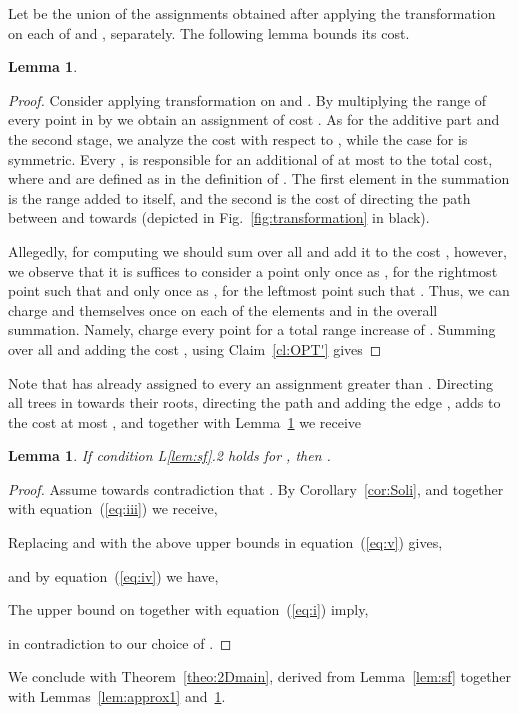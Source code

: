 \documentclass[a4paper]{article}
\newtheorem{lemma}[theorem]{Lemma}
\begin{document}
\begin{algorithm}[htp]
\begin{algorithmic}
Let  be the union of the assignments obtained
after applying the transformation  on each of  and , separately.
The following lemma bounds its cost.
\begin{lemma}\label{lem:g(rho)}

\end{lemma}
\begin{proof}
Consider applying transformation  on  and .
By multiplying the range of every point in  by 
we obtain an assignment of cost .
As for the additive part and the second stage, we analyze the cost with respect to , while the case for  is symmetric.
Every , is responsible for an additional of at most 
to the total cost,
where  and  are defined as in the definition of .
The first element in the summation is the range added to  itself,
and the second is the cost of directing the path between 
and  towards  (depicted in Fig.~\ref{fig:transformation} in black).

Allegedly, for computing  we should sum  over all  and add it to the cost ,
however, we observe that it is suffices to consider a point  only once
as , for the rightmost point  such that  and only once
as , for the leftmost point  such that .
Thus, we can charge  and  themselves once on 
each of the elements  and  in the overall summation.
Namely, charge every point  for a total range increase of .
Summing  over all  and adding the cost , using Claim~\ref{cl:OPT'} gives 

\end{proof}

Note that  has already assigned to every  an assignment greater than .
Directing all trees in  towards their roots,
directing the path  and adding the edge , adds to the cost
at most , and
together with Lemma~\ref{lem:g(rho)} we receive

\begin{lemma}\label{lem:approx2}
If condition L\ref{lem:sf}.2 holds for ,
then .
\end{lemma}
\begin{proof}
Assume towards contradiction that . 
By Corollary~\ref{cor:Soli},  and together with equation~(\ref{eq:iii}) we receive,

Replacing  and  with the above upper bounds in equation~(\ref{eq:v}) gives,

and by equation~(\ref{eq:iv}) we have,

The upper bound on  together with equation~(\ref{eq:i}) imply,

in contradiction to our choice of .
\end{proof}
We conclude with Theorem~\ref{theo:2Dmain}, derived from
Lemma~\ref{lem:sf} together with Lemmas~\ref{lem:approx1} and~\ref{lem:approx2}.


\end{algorithmic}
\end{algorithm}
\end{document}
